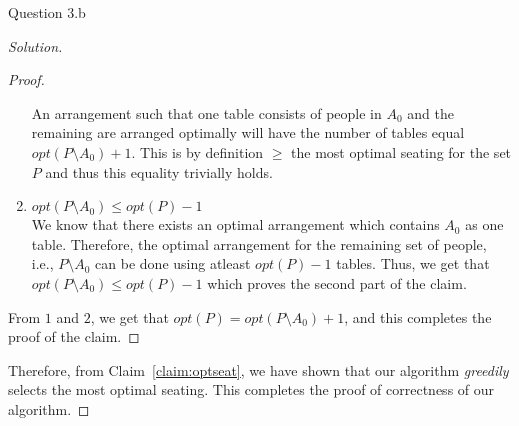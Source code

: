 \begin{solution}{Question 3.b}
\begin{proof}[Solution]
\begin{proof}
\begin{enumerate}
                    An arrangement such that one table consists of people in $A_0$ and the remaining are arranged optimally will have the number of tables equal $opt(P\setminus A_0)+1$. This is by definition $\geq$ the most optimal seating for the set $P$ and thus this equality trivially holds.
                \item{$opt(P\setminus A_0)\leq opt(P)-1$}\\
                    We know that there exists an optimal arrangement which contains $A_0$ as one table. Therefore, the optimal arrangement for the remaining set of people, i.e., $P\setminus A_0$ can be done using atleast $opt(P)-1$ tables. Thus, we get that $opt(P\setminus A_0)\leq opt(P)-1$ which proves the second part of the claim.
            \end{enumerate}
            From $1$ and $2$, we get that $opt(P)=opt(P\setminus A_0)+1$, and this completes the proof of the claim.
        \end{proof}
        Therefore, from Claim~\ref{claim:optseat}, we have shown that our algorithm \textit{greedily} selects the most optimal seating. This completes the proof of correctness of our algorithm.
    \end{proof}
\end{solution}
